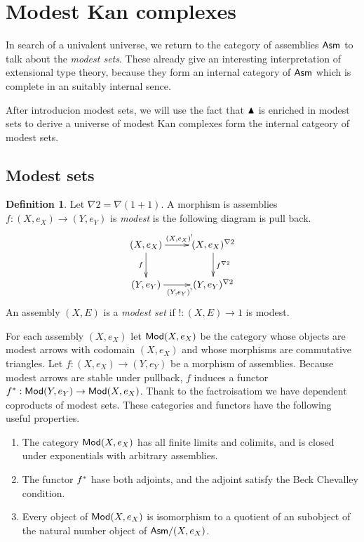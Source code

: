 \documentclass{amsart}
\theoremstyle{plain}
\theoremstyle{definition}
\newtheorem{defin}[theorem]{Definition}
\newcommand\hide[1]{}
\begin{document}
\section{Modest Kan complexes}
In search of a univalent universe, we return to the category of assemblies $\mathsf{Asm}$ to talk about the \emph{modest sets}. These already give an interesting interpretation of extensional type theory, because they form an internal category of $\mathsf{Asm}$ which is complete in an suitably internal sence. 

After introducion modest sets, we will use the fact that $\blacktriangle$ is enriched in modest sets to derive a universe of modest Kan complexes form the internal catgeory of modest sets.

\subsection{Modest sets}
\newcommand\bang{!}
\newcommand\boldy{\nabla 2}
\begin{defin} Let $\boldy = \nabla(1+1)$. A morphism is assemblies $f:(X,e_X)\to(Y,e_Y)$ is \emph{modest} is the following diagram is pull back.
\[\xymatrix{
(X,e_X) \ar[r]^{(X,e_X)^\bang} \ar[d]_{f} & (X,e_X)^{\boldy} \ar[d]^{f^{\boldy}}\\
(Y,e_Y) \ar[r]_{(Y,e_Y)^\bang} & (Y,e_Y)^{\boldy}
}\]
An assembly $(X,E)$ is a \emph{modest set} if $!:(X,E)\to 1$ is modest.
\end{defin}

For each assembly $(X,e_X)$ let $\mathsf{Mod}(X,e_X)$ be the category whose objects are modest arrows with codomain $(X,e_X)$ and whose morphisms are commutative triangles. Let $f:(X,e_X)\to(Y,e_Y)$ be a morphism of assemblies. Because modest arrows are stable under pullback, $f$ induces a functor $f^*:\mathsf{Mod}(Y,e_Y) \to \mathsf{Mod}(X,e_X)$. Thank to the factroisatiom we have dependent coproducts of modest sets. These categories and functors have the following useful properties.\hide{cite Hyland et alt. Rosolini's modest sets maybe...}
\begin{enumerate}
\item The category $\mathsf{Mod}(X,e_X)$ has all finite limits and colimits, and is closed under exponentials with arbitrary assemblies.
\item The functor $f^*$ hase both adjoints, and the adjoint satisfy the Beck Chevalley condition.
\item Every object of $\mathsf{Mod}(X,e_X)$ is isomorphism to a quotient of an subobject of the natural number object of $\mathsf{Asm}/(X,e_X)$.
\end{enumerate}
\end{document}

